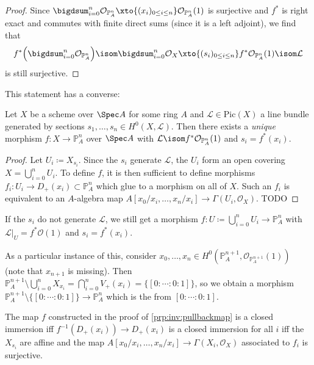 \documentclass[wip, algebra]{bsteffan-lecturenotes}
\newcommand{\cO}{\mathcal{O}}
\newcommand{\cL}{\mathcal{L}}
\renewcommand{\P}{\mathbb{P}}
\newcommand{\Pic}{\mathrm{Pic}}
\begin{document}
\begin{proof}
	Since $\bigdsum_{i = 0}^n \cO_{\P^n_A} \xto{(x_i)_{0 \leq i \leq n}} \cO_{\P^n_A}(1)$ is surjective and $f^*$ is right exact and commutes with finite direct sums (since it is a left adjoint), we find that 
	\begin{equation*}
		f^*\Bigl(\bigdsum_{i = 0}^n \cO_{\P^n_A}\Bigr) \isom \bigdsum_{i = 0}^n \cO_X \xto{(s_i)_{0 \leq i \leq n}} f^* \cO_{\P^n_A}(1) \isom \cL
	\end{equation*}
	is still surjective.
\end{proof}
This statement has a converse: 
\begin{proposition}\label{prp:inv:pullbackmap}
	Let $X$ be a scheme over $\Spec A$ for some ring $A$ and $\cL \in \Pic(X)$ a line bundle generated by sections $s_1, \ldots, s_n \in H^0(X, \cL)$.
	Then there exists a \emph{unique} morphism $f\colon X \to \P^n_A$ over $\Spec A$ with $\cL \isom f^* \cO_{\P^n_A}(1)$ and $s_i = f^*(x_i)$.
\end{proposition}
\begin{proof}
	Let $U_i \coloneq X_{s_i}$.
	Since the $s_i$ generate $\cL$, the $U_i$ form an open covering $X = \bigcup_{i = 0}^n U_i$.
	To define $f$, it is then sufficient to define morphisms $f_i\colon U_i \to D_+(x_i) \subset \P^n_A$ which glue to a morphism on all of $X$. 
	Such an $f_i$ is equivalent to an $A$-algebra map $A[x_0 / x_i, \ldots, x_n / x_i] \to \Gamma(U_i, \cO_X)$.
	TODO
\end{proof}
\begin{remark}
	If the $s_i$ do not generate $\cL$, we still get a morphism $f\colon U \coloneq \bigcup_{i = 0}^n U_i \to \P^n_A$ with $\cL|_U = f^* \cO(1)$ and $s_i = f^*(x_i)$.

	As a particular instance of this, consider $x_0, \ldots, x_n \in H^0(\P^{n + 1}_A, \cO_{\P^{n + 1}_A}(1))$ (note that $x_{n + 1}$ is missing).
	Then $\P^{n + 1}_A \setminus \bigcup_{i = 0}^n X_{x_i} = \bigcap_{i = 0}^n V_+(x_i) = \{[0 : \cdots : 0 : 1]\}$, so we obtain a morphism $\P^{n + 1}_A \setminus \{[0 : \cdots : 0 : 1]\} \to \P^n_A$ which is the  from $[0 : \cdots : 0 : 1]$.
\end{remark}
\begin{remark}
	The map $f$ constructed in the proof of \cref{prp:inv:pullbackmap} is a closed immersion iff $f^{-1}(D_+(x_i)) \to D_+(x_i)$ is a closed immersion for all $i$ iff the $X_{s_i}$ are affine and the map $A[x_0 / x_i, \ldots, x_n / x_i] \to \Gamma(X_i, \cO_X)$ associated to $f_i$ is surjective.
\end{remark}
\end{document}
